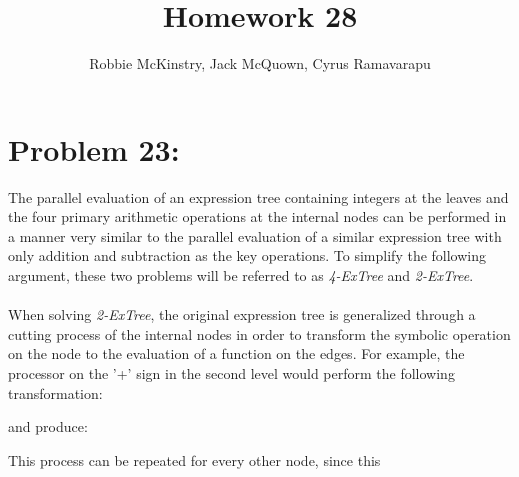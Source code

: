 \documentclass[12pt]{article}
\begin{document}
\title{Homework 28}
\author{Robbie McKinstry, Jack McQuown, Cyrus Ramavarapu}
\renewcommand{\today}{7 November 2016}
\renewcommand{\baselinestretch}{1.5}
\maketitle

\section*{Problem 23: }
The parallel evaluation of an expression tree containing
integers at the leaves and the four primary arithmetic 
operations at the internal nodes can be performed in
a manner very similar to the parallel evaluation of a
similar expression tree with only addition and subtraction
as the key operations.  To simplify the following argument,
these two problems will be referred to as \textit{4-ExTree}
and \textit{2-ExTree}.\\\\
When solving \textit{2-ExTree}, the original expression tree
is generalized through a cutting process of the internal nodes
in order to transform the symbolic operation on the node to
the evaluation of a function on the edges. For example,
the processor on the '+' sign in the second level would
perform the following transformation:
\begin{center}
\end{center}
and produce:
\begin{center}
\end{center}
This process can be repeated for every other node, since this
\end{document}
